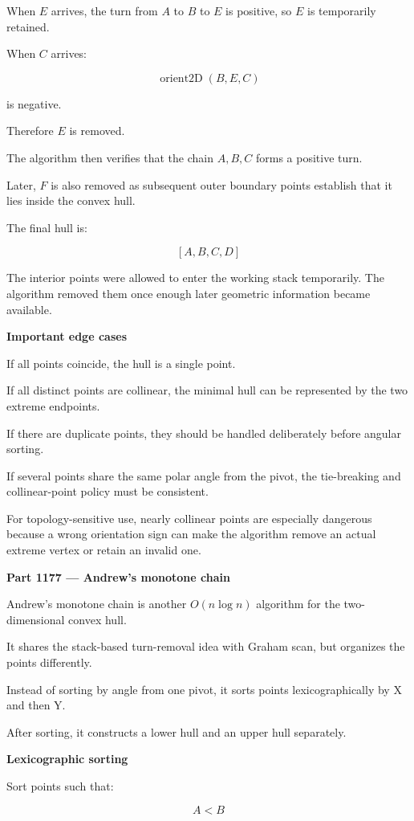 When \(E\) arrives, the turn from \(A\) to \(B\) to \(E\) is positive, so \(E\) is temporarily retained.

When \(C\) arrives:

\[
\operatorname{orient2D}(B,E,C)
\]

is negative.

Therefore \(E\) is removed.

The algorithm then verifies that the chain \(A,B,C\) forms a positive turn.

Later, \(F\) is also removed as subsequent outer boundary points establish that it lies inside the convex hull.

The final hull is:

\[
\boxed{[A,B,C,D]}
\]

The interior points were allowed to enter the working stack temporarily. The algorithm removed them once enough later geometric information became available.

\textbf{Important edge cases}

If all points coincide, the hull is a single point.

If all distinct points are collinear, the minimal hull can be represented by the two extreme endpoints.

If there are duplicate points, they should be handled deliberately before angular sorting.

If several points share the same polar angle from the pivot, the tie-breaking and collinear-point policy must be consistent.

For topology-sensitive use, nearly collinear points are especially dangerous because a wrong orientation sign can make the algorithm remove an actual extreme vertex or retain an invalid one.

\textbf{Part 1177 --- Andrew's monotone chain}

Andrew's monotone chain is another \(O(n\log n)\) algorithm for the two-dimensional convex hull.

It shares the stack-based turn-removal idea with Graham scan, but organizes the points differently.

Instead of sorting by angle from one pivot, it sorts points lexicographically by X and then Y.

After sorting, it constructs a lower hull and an upper hull separately.

\textbf{Lexicographic sorting}

Sort points such that:

\[
A<B
\]

